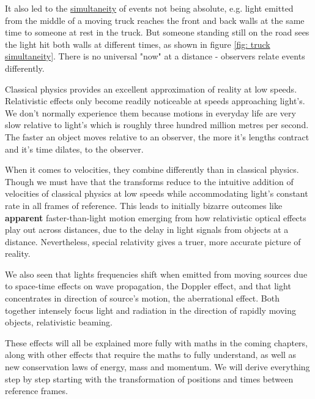 It also led to the \hyperlink{def-simultaneity}{simultaneity} of events not being absolute, e.g. light emitted from the middle of a moving truck reaches the front and back walls at the same time to someone at rest in the truck. But someone standing still on the road sees the light hit both walls at different times, as shown in figure \ref{fig: truck simultaneity}. There is no universal "now" at a distance - observers relate events differently.

Classical physics provides an excellent approximation of reality at low speeds. Relativistic effects only become readily noticeable at speeds approaching light's. We don't normally experience them because motions in everyday life are very slow relative to light's which is roughly three hundred million metres per second. The faster an object moves relative to an observer, the more it's lengths contract and it's time dilates, to the observer.

When it comes to velocities, they combine differently than in classical physics. Though we must have that the transforms reduce to the intuitive addition of velocities of classical physics at low speeds while accommodating light's constant rate in all frames of reference. This leads to initially bizarre outcomes like \textbf{apparent} faster-than-light motion emerging from how relativistic optical effects play out across distances, due to the delay in light signals from objects at a distance. Nevertheless, special relativity gives a truer, more accurate picture of reality.

We also seen that lights frequencies shift when emitted from moving sources due to space-time effects on wave propagation, the Doppler effect, and that light concentrates in direction of source's motion, the aberrational effect. Both together intensely focus light and radiation in the direction of rapidly moving objects, relativistic beaming.

These effects will all be explained more fully with maths in the coming chapters, along with other effects that require the maths to fully understand, as well as new conservation laws of energy, mass and momentum. We will derive everything step by step starting with the transformation of positions and times between reference frames.





